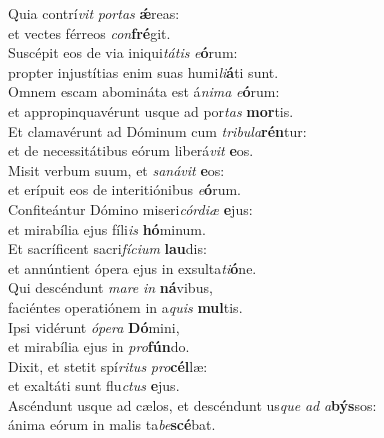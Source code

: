 \evenverse Quia contrí\textit{vit} \textit{por}\textit{tas} \textbf{ǽ}reas:~\*\\
\evenverse et vectes férreos \textit{con}\textbf{fré}git.\\
\oddverse Suscépit eos de via iniqui\textit{tá}\textit{tis} \textit{e}\textbf{ó}rum:~\*\\
\oddverse propter injustítias enim suas humi\textit{li}\textbf{á}ti sunt.\\
\evenverse Omnem escam abomináta est á\textit{ni}\textit{ma} \textit{e}\textbf{ó}rum:~\*\\
\evenverse et appropinquavérunt usque ad por\textit{tas} \textbf{mor}tis.\\
\oddverse Et clamavérunt ad Dóminum cum \textit{tri}\textit{bu}\textit{la}\textbf{rén}tur:~\*\\
\oddverse et de necessitátibus eórum liberá\textit{vit} \textbf{e}os.\\
\evenverse Misit verbum suum, et \textit{sa}\textit{ná}\textit{vit} \textbf{e}os:~\*\\
\evenverse et erípuit eos de interitiónibus \textit{e}\textbf{ó}rum.\\
\oddverse Confiteántur Dómino miseri\textit{cór}\textit{di}\textit{æ} \textbf{e}jus:~\*\\
\oddverse et mirabília ejus fíli\textit{is} \textbf{hó}minum.\\
\evenverse Et sacríficent sacri\textit{fí}\textit{ci}\textit{um} \textbf{lau}dis:~\*\\
\evenverse et annúntient ópera ejus in exsulta\textit{ti}\textbf{ó}ne.\\
\oddverse Qui descéndunt \textit{ma}\textit{re} \textit{in} \textbf{ná}vibus,~\*\\
\oddverse faciéntes operatiónem in a\textit{quis} \textbf{mul}tis.\\
\evenverse Ipsi vidérunt \textit{ó}\textit{pe}\textit{ra} \textbf{Dó}mini,~\*\\
\evenverse et mirabília ejus in \textit{pro}\textbf{fún}do.\\
\oddverse Dixit, et stetit spí\textit{ri}\textit{tus} \textit{pro}\textbf{cél}læ:~\*\\
\oddverse et exaltáti sunt flu\textit{ctus} \textbf{e}jus.\\
\evenverse Ascéndunt usque ad cælos, et descéndunt us\textit{que} \textit{ad} \textit{a}\textbf{býs}sos:~\*\\
\evenverse ánima eórum in malis ta\textit{be}\textbf{scé}bat.\\
